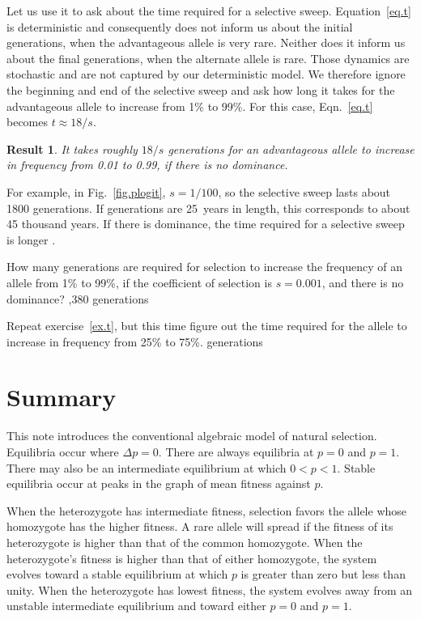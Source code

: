 \documentclass[11pt]{article}
\newtheorem{result}{Result}
\begin{document}
Let us use it to ask about the time required for a selective
sweep. Equation~\ref{eq.t} is deterministic and consequently does not
inform us about the initial generations, when the advantageous allele
is very rare. Neither does it inform us about the final generations,
when the alternate allele is rare. Those dynamics are stochastic and
are not captured by our deterministic model. We therefore ignore the
beginning and end of the selective sweep and ask how long it takes for
the advantageous allele to increase from 1\% to 99\%. For this case,
Eqn.~\ref{eq.t} becomes $t \approx 18/s$.
\begin{result}
  It takes roughly $18/s$ generations for an advantageous allele to
  increase in frequency from 0.01 to 0.99, if there is no dominance.
\end{result}  
For example, in Fig.~\ref{fig.plogit}, $s=1/100$, so the selective
sweep lasts about 1800 generations.  If generations are 25~years in
length, this corresponds to about 45 thousand years. If there is
dominance, the time required for a selective sweep is longer
\citetext{\citealp[p.~193]{Crow:IPG-70};
  \citealp[Box~3.2]{Charlesworth:EEG-10}}.

\begin{exercise}
  \label{ex.t}
  How many generations are required for selection to increase the
  frequency of an allele from 1\% to 99\%, if the coefficient of
  selection is $s=0.001$, and there is no dominance?
  ,380 generations
\end{exercise}

\begin{exercise}
  \label{ex.t2}
  Repeat exercise~\ref{ex.t}, but this time figure out the time
  required for the allele to increase in frequency from 25\% to 75\%.
   generations
\end{exercise}

\section{Summary}
This note introduces the conventional algebraic model of natural
selection. Equilibria occur where $\Delta p=0$. There are always
equilibria at $p=0$ and $p=1$. There may also be an intermediate
equilibrium at which $0 < p < 1$. Stable equilibria occur at peaks in
the graph of mean fitness against $p$.

When the heterozygote has intermediate fitness, selection favors the
allele whose homozygote has the higher fitness. A rare allele will
spread if the fitness of its heterozygote is higher than that of the
common homozygote. When the heterozygote's fitness is higher than that
of either homozygote, the system evolves toward a stable equilibrium
at which $p$ is greater than zero but less than unity. When the
heterozygote has lowest fitness, the system evolves away from an
unstable intermediate equilibrium and toward either $p=0$ and $p=1$.
\end{document}
